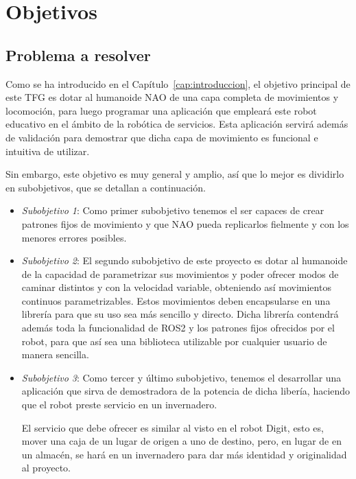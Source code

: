 \chapter{Objetivos}\label{cap:objetivos}

\section{Problema a resolver}

Como se ha introducido en el Capítulo~\ref{cap:introduccion}, el objetivo principal de este TFG es dotar al humanoide NAO de una capa completa de movimientos y locomoción, para luego programar una aplicación que empleará este robot educativo en el ámbito de la robótica de servicios. Esta aplicación servirá además de validación para demostrar que dicha capa de movimiento es funcional e intuitiva de utilizar.

Sin embargo, este objetivo es muy general y amplio, así que lo mejor es dividirlo en subobjetivos, que se detallan a continuación.

\begin{itemize}
    \item \textit{Subobjetivo 1}: Como primer subobjetivo tenemos el ser capaces de crear patrones fijos de movimiento y que NAO pueda replicarlos fielmente y con los menores errores posibles.
    \item \textit{Subobjetivo 2}: El segundo subobjetivo de este proyecto es dotar al humanoide de la capacidad de parametrizar sus movimientos y  poder ofrecer modos de caminar distintos y con la velocidad variable, obteniendo así movimientos continuos parametrizables. Estos movimientos deben encapsularse en una librería para que su uso sea más sencillo y directo. Dicha librería contendrá además toda la funcionalidad de ROS2 y los patrones fijos ofrecidos por el robot, para que así sea una biblioteca utilizable por cualquier usuario de manera sencilla.
    \item \textit{Subobjetivo 3}: Como tercer y último subobjetivo, tenemos el desarrollar una aplicación que sirva de demostradora de la potencia de dicha libería, haciendo que el robot preste servicio en un invernadero.

    El servicio que debe ofrecer es similar al visto en el robot Digit, esto es, mover una caja de un lugar de origen a uno de destino, pero, en lugar de en un almacén, se hará en un invernadero para dar más identidad y originalidad al proyecto.
\end{itemize}

